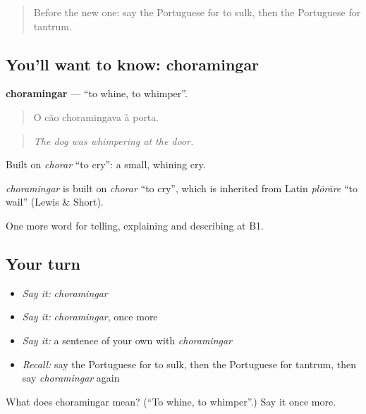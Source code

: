 \label{lesson:PT-C474-choramingar}



\begin{quote}
Before the new one: say the Portuguese for to sulk, then the Portuguese for tantrum.
\end{quote}

\subsection*{You'll want to know: choramingar}
\textbf{choramingar} — \textquotedblleft{}to whine, to whimper\textquotedblright{}.

\begin{quote}
O cão choramingava à porta.
\end{quote}

\begin{quote}
\emph{The dog was whimpering at the door.}
\end{quote}

Built on \emph{chorar} \textquotedblleft{}to cry\textquotedblright{}: a small, whining cry.

\begin{cousinweb}
\emph{choramingar} is built on \emph{chorar} \textquotedblleft{}to cry\textquotedblright{}, which is inherited from Latin \emph{plōrāre} \textquotedblleft{}to wail\textquotedblright{} (Lewis \& Short).
\end{cousinweb}

\begin{grammarlens}[title={What you've built}]
One more word for telling, explaining and describing at B1.
\end{grammarlens}

\subsection*{Your turn}
\begin{itemize}
\raggedright
  \item \emph{Say it:} \emph{choramingar}
  \item \emph{Say it:} \emph{choramingar}, once more
  \item \emph{Say it:} a sentence of your own with \emph{choramingar}
  \item \emph{Recall:} say the Portuguese for to sulk, then the Portuguese for tantrum, then say \emph{choramingar} again
\end{itemize}

\begin{tcolorbox}[breakable,colback=teal!4,colframe=teal!35!black,title={Before you move on}]
What does choramingar mean? (\textquotedblleft{}To whine, to whimper\textquotedblright{}.) Say it once more.
\end{tcolorbox}
